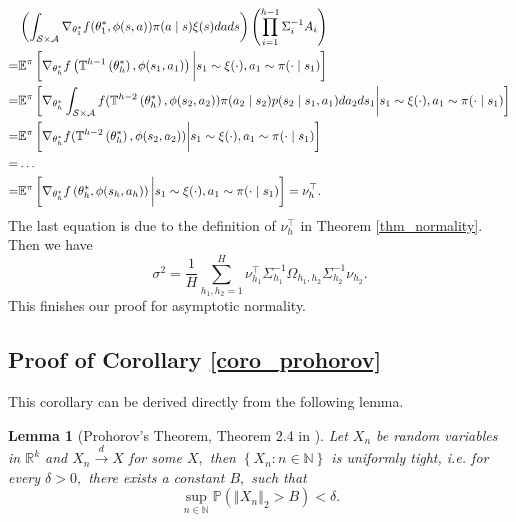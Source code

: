 \documentclass{article}
\numberwithin{equation}{section}
\theoremstyle{plain}
\newtheorem{lemma}[theorem]{Lemma}
\theoremstyle{definition}
\theoremstyle{remark}
\begin{document}
\begin{align}
    &\left(\int_{\mathcal{S} \times \mathcal{A}} \nabla_{\theta_1^*} f(\theta_1^*,\phi(s,a)) \pi(a \mid s) \xi(s) d a d s\right) \left(\prod_{i=1}^{h-1} \Sigma_i^{-1} A_i \right) \notag \\
     = & \mathbb{E}^{\pi} \left[\nabla_{\theta_h^*} f\left(\mathbb{T}^{h-1}\left(\theta_{h}^*\right), \phi(s_1, a_1)\right) \bigg| s_1 \sim \xi(\cdot), a_1 \sim \pi(\cdot \mid s_1)\right] \notag \\
    = & \mathbb{E}^{\pi}\left[\nabla_{\theta_h^*} \int_{\mathcal{S} \times \mathcal{A}} f(\mathbb{T}^{h-2}\left(\theta_{h}^*\right),\phi(s_2,a_2)) \pi(a_2 \mid s_2) p(s_2 \mid s_1,a_1) d a_2 d s_1 \bigg| s_1 \sim \xi(\cdot), a_1 \sim \pi(\cdot \mid s_1)\right] \notag \\
    = & \mathbb{E}^{\pi} \left[ \nabla_{\theta_h^*} f(\mathbb{\mathbb{T}}^{h-2}\left(\theta_{h}^*\right),\phi(s_2,a_2)) \bigg| s_1 \sim \xi(\cdot), a_1 \sim \pi(\cdot \mid s_1)\right] \notag \\
    = &\dots \notag \\
    = & \mathbb{E}^{\pi} \left[ \nabla_{\theta_h^*} f\left(\theta_{h}^*,\phi(s_h,a_h)\right) \bigg| s_1 \sim \xi(\cdot), a_1 \sim \pi(\cdot \mid s_1)\right] = \nu_h^{\top}. \label{derivation_nu}
\end{align}
The last equation is due to the definition of $\nu_h^{\top}$ in Theorem \ref{thm_normality}. Then we have
\begin{equation}
    \sigma^2 = \frac{1}{H} \sum_{h_1,h_2 = 1}^H  \nu_{h_1}^{\top} \Sigma^{-1}_{h_1} \Omega_{h_1,h_2} \Sigma^{-1}_{h_2} \nu_{h_2}.
\end{equation}
This finishes our proof for asymptotic normality.
\subsection{Proof of Corollary \ref{coro_prohorov}}
This corollary can be derived directly from the following lemma.
    \begin{lemma}[Prohorov's Theorem, Theorem 2.4 in \cite{van}]
       Let $X_n$ be random variables in $\mathbb{R}^k$ and $X_n \stackrel{d}{\longrightarrow} X$ for some $X,$ then $\left\{X_n : n \in \mathbb{N}\right\}$ is uniformly tight, i.e. for every $\delta > 0,$ there exists a constant $B,$ such that
       $$
       \sup_{n \in \mathbb{N}} \mathbb{P} \left(\left\Vert X_n \right\Vert_2 > B \right) < \delta.
       $$
    \end{lemma}
    
\end{document}
